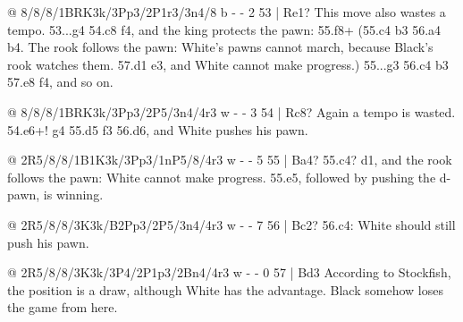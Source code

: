 @ 8/8/8/1BRK3k/3Pp3/2P1r3/3n4/8 b - - 2 53 | Re1?
This move also wastes a tempo. 53...\K g4 54.\R c8 \K f4, and the king protects the pawn: 55.\R f8+ (55.c4 \R b3 56.\B a4 \R b4. The rook follows the pawn: White's pawns cannot march, because Black's rook watches them. 57.\B d1 \K e3, and White cannot make progress.) 55...\K g3 56.c4 \R b3 57.\R e8 \K f4, and so on.

@ 8/8/8/1BRK3k/3Pp3/2P5/3n4/4r3 w - - 3 54 | Rc8?
Again a tempo is wasted. 54.\K e6+! \K g4 55.d5 \N f3 56.d6, and White pushes his pawn.

@ 2R5/8/8/1B1K3k/3Pp3/1nP5/8/4r3 w - - 5 55 | Ba4?
55.c4? \R d1, and the rook follows the pawn: White cannot make progress. 55.\K e5, followed by pushing the d-pawn, is winning.

@ 2R5/8/8/3K3k/B2Pp3/2P5/3n4/4r3 w - - 7 56 | Bc2?
56.c4: White should still push his pawn.

@ 2R5/8/8/3K3k/3P4/2P1p3/2Bn4/4r3 w - - 0 57 | Bd3
According to Stockfish, the position is a draw, although White has the advantage. Black somehow loses the game from here.

